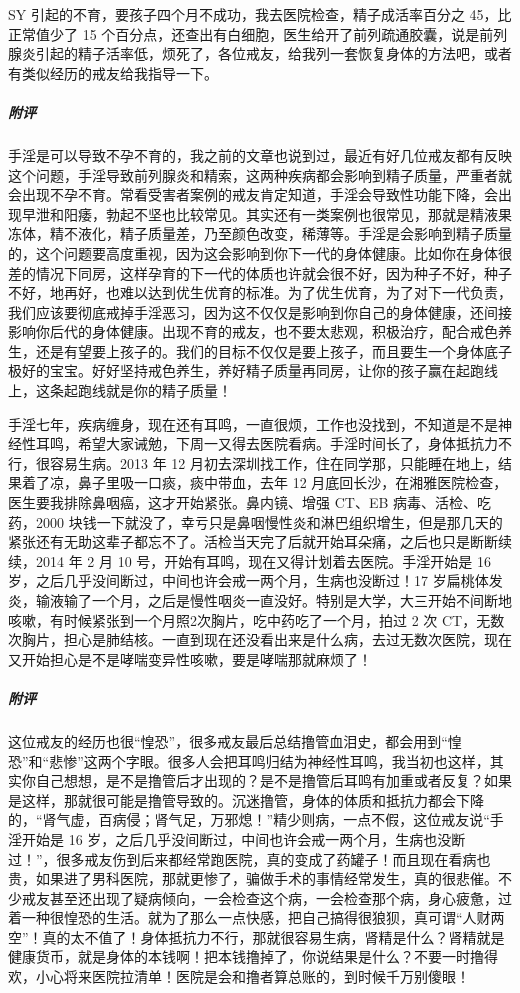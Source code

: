 \begin{case}
    SY 引起的不育，要孩子四个月不成功，我去医院检查，精子成活率百分之 45，比正常值少了 15 个百分点，还查出有白细胞，医生给开了前列疏通胶囊，说是前列腺炎引起的精子活率低，烦死了，各位戒友，给我列一套恢复身体的方法吧，或者有类似经历的戒友给我指导一下。
    \subparagraph{附评} 手淫是可以导致不孕不育的，我之前的文章也说到过，最近有好几位戒友都有反映这个问题，手淫导致前列腺炎和精索，这两种疾病都会影响到精子质量，严重者就会出现不孕不育。常看受害者案例的戒友肯定知道，手淫会导致性功能下降，会出现早泄和阳痿，勃起不坚也比较常见。其实还有一类案例也很常见，那就是精液果冻体，精不液化，精子质量差，乃至颜色改变，稀薄等。手淫是会影响到精子质量的，这个问题要高度重视，因为这会影响到你下一代的身体健康。比如你在身体很差的情况下同房，这样孕育的下一代的体质也许就会很不好，因为种子不好，种子不好，地再好，也难以达到优生优育的标准。为了优生优育，为了对下一代负责，我们应该要彻底戒掉手淫恶习，因为这不仅仅是影响到你自己的身体健康，还间接影响你后代的身体健康。出现不育的戒友，也不要太悲观，积极治疗，配合戒色养生，还是有望要上孩子的。我们的目标不仅仅是要上孩子，而且要生一个身体底子极好的宝宝。好好坚持戒色养生，养好精子质量再同房，让你的孩子赢在起跑线上，这条起跑线就是你的精子质量！
\end{case}

\begin{case}
    手淫七年，疾病缠身，现在还有耳鸣，一直很烦，工作也没找到，不知道是不是神经性耳鸣，希望大家诫勉，下周一又得去医院看病。手淫时间长了，身体抵抗力不行，很容易生病。2013 年 12 月初去深圳找工作，住在同学那，只能睡在地上，结果着了凉，鼻子里吸一口痰，痰中带血，去年 12 月底回长沙，在湘雅医院检查，医生要我排除鼻咽癌，这才开始紧张。鼻内镜、增强 CT、EB 病毒、活检、吃药，2000 块钱一下就没了，幸亏只是鼻咽慢性炎和淋巴组织增生，但是那几天的紧张还有无助这辈子都忘不了。活检当天完了后就开始耳朵痛，之后也只是断断续续，2014 年 2 月 10 号，开始有耳鸣，现在又得计划着去医院。手淫开始是 16 岁，之后几乎没间断过，中间也许会戒一两个月，生病也没断过！17 岁扁桃体发炎，输液输了一个月，之后是慢性咽炎一直没好。特别是大学，大三开始不间断地咳嗽，有时候紧张到一个月照2次胸片，吃中药吃了一个月，拍过 2 次 CT，无数次胸片，担心是肺结核。一直到现在还没看出来是什么病，去过无数次医院，现在又开始担心是不是哮喘变异性咳嗽，要是哮喘那就麻烦了！
    \subparagraph{附评} 这位戒友的经历也很“惶恐”，很多戒友最后总结撸管血泪史，都会用到“惶恐”和“悲惨”这两个字眼。很多人会把耳鸣归结为神经性耳鸣，我当初也这样，其实你自己想想，是不是撸管后才出现的？是不是撸管后耳鸣有加重或者反复？如果是这样，那就很可能是撸管导致的。沉迷撸管，身体的体质和抵抗力都会下降的，“肾气虚，百病侵；肾气足，万邪熄！”精少则病，一点不假，这位戒友说“手淫开始是 16 岁，之后几乎没间断过，中间也许会戒一两个月，生病也没断过！”，很多戒友伤到后来都经常跑医院，真的变成了药罐子！而且现在看病也贵，如果进了男科医院，那就更惨了，骗做手术的事情经常发生，真的很悲催。不少戒友甚至还出现了疑病倾向，一会检查这个病，一会检查那个病，身心疲惫，过着一种很惶恐的生活。就为了那么一点快感，把自己搞得很狼狈，真可谓“人财两空”！真的太不值了！身体抵抗力不行，那就很容易生病，肾精是什么？肾精就是健康货币，就是身体的本钱啊！把本钱撸掉了，你说结果是什么？不要一时撸得欢，小心将来医院拉清单！医院是会和撸者算总账的，到时候千万别傻眼！
\end{case}

